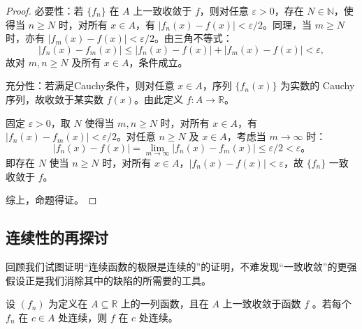\begin{proof}
  必要性：若 \(\{f_n\}\) 在 \(A\) 上一致收敛于 \(f\)，则对任意 \(\varepsilon > 0\)，存在 \(N \in \mathbb{N}\)，使得当 \(n \geq N\) 时，对所有 \(x \in A\)，有 \(|f_n(x) - f(x)| < \varepsilon/2\)。同理，当 \(m \geq N\) 时，亦有 \(|f_m(x) - f(x)| < \varepsilon/2\)。由三角不等式：
\[
|f_n(x) - f_m(x)| \leq |f_n(x) - f(x)| + |f_m(x) - f(x)| < \varepsilon,
\]
故对 \(m,n \geq N\) 及所有 \(x \in A\)，条件成立。

充分性：若满足Cauchy条件，则对任意 \(x \in A\)，序列 \(\{f_n(x)\}\) 为实数的 Cauchy序列，故收敛于某实数 \(f(x)\)。由此定义 \(f: A \to \mathbb{R}\)。

固定 \(\varepsilon > 0\)，取 \(N\) 使得当 \(m,n \geq N\) 时，对所有 \(x \in A\)，有 \(|f_n(x) - f_m(x)| < \varepsilon/2\)。对任意 \(n \geq N\) 及 \(x \in A\)，考虑当 \(m \to \infty\) 时：
\[
|f_n(x) - f(x)| = \lim_{m \to \infty} |f_n(x) - f_m(x)| \leq \varepsilon/2 < \varepsilon。
\]
即存在 \(N\) 使当 \(n \geq N\) 时，对所有 \(x \in A\)，\(|f_n(x) - f(x)| < \varepsilon\)，故 \(\{f_n\}\) 一致收敛于 \(f\)。

综上，命题得证。
\end{proof}

\subsection{连续性的再探讨}
回顾我们试图证明“连续函数的极限是连续的”的证明，不难发现“一致收敛”的更强假设正是我们消除其中的缺陷的所需要的工具。

\begin{Thm}\label{thm:6.2.6}
  设 \(\left( {f}_{n}\right)\) 为定义在 \(A \subseteq  \mathbb{R}\) 上的一列函数，且在 \(A\) 上一致收敛于函数 \(f\) 。若每个 \({f}_{n}\) 在 \(c \in  A\) 处连续，则 \(f\) 在 \(c\) 处连续。
\end{Thm}



